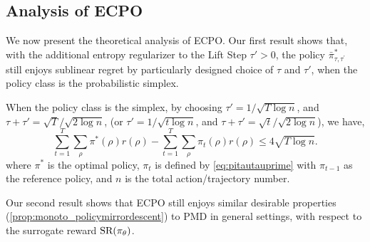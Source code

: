 \subsection{Analysis of ECPO}
We now present the theoretical analysis of ECPO. Our first result shows that, with the additional entropy regularizer to the Lift Step $\tau' > 0$, the policy $\bar{\pi}_{\tau,\tau^{\prime}}^*$ still enjoys sublinear regret by particularly designed choice of $\tau$ and $\tau'$, when the policy class is the probabilistic simplex. 

\begin{thm}
\label{thm:sublinear_regret_simplex}
When the policy class is the simplex, by choosing $\tau'=1/\sqrt{T\log{n}}$, and $\tau + \tau' = \sqrt{T} / \sqrt{2\log n}$, (or $\tau'=1/\sqrt{t\log{n}}$, and $\tau + \tau' = \sqrt{t} / \sqrt{2\log n}$), we have,
\begin{equation*}
    \sum\limits_{t=1}^{T}{ \sum\limits_{\rho}{ \pi^*(\rho) r(\rho)}} - \sum\limits_{t=1}^{T}{ \sum\limits_{\rho}{ \pi_t(\rho) r(\rho)}} \le 4\sqrt{T\log n}.
\end{equation*}
where $\pi^*$ is the optimal policy, $\pi_{t}$ is defined by \cref{eq:pitautauprime} with $\pi_{t-1}$ as the reference policy, and $n$ is the total action/trajectory number.
\end{thm}

Our second result shows that ECPO still enjoys similar desirable properties (\cref{prop:monoto_policymirrordescent}) to PMD
in general settings, with respect to the surrogate reward $\text{SR}(\pi_\theta)$.

